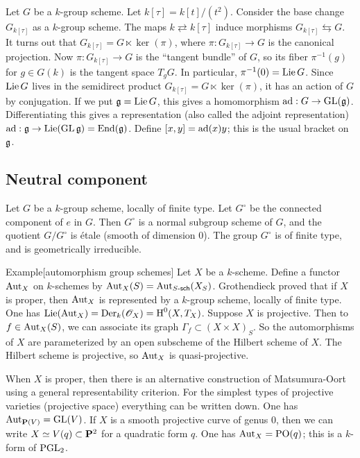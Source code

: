 Let $G$ be a $k$-group scheme. Let $k[\tau]=k[t]/(t^2)$. Consider the base 
change $G_{k[\tau]}$ as a $k$-group scheme. The maps $k\rightleftarrows k[\tau]$ 
induce morphisms $G_{k[\tau]} \leftrightarrows G$. It turns out that 
$G_{k[\tau]} = G\ltimes \ker(\pi)$, where $\pi:G_{k[\tau]} \to G$ is the canonical 
projection. Now $\pi:G_{k[\tau]}\to G$ is the ``tangent bundle'' of 
$G$, so its fiber $\pi^{-1}(g)$ for $g\in G(k)$ is the tangent space 
$T_g G$. In particular, $\pi^{-1}(0) = \operatorname{Lie} G$. Since $\operatorname{Lie} G$ lives in the 
semidirect product $G_{k[\tau]} = G\ltimes \ker(\pi)$, it has an action of 
$G$ by conjugation. If we put $\mathfrak{g}=\operatorname{Lie} G$, this gives a homomorphism 
$\operatorname{ad}:G\to \operatorname{GL}(\mathfrak{g})$. Differentiating this gives a representation 
(also called the adjoint representation) 
$\operatorname{ad}:\mathfrak{g} \to \operatorname{Lie}(\operatorname{GL}\mathfrak{g}) = \operatorname{End}(\mathfrak{g})$. Define 
$[x,y] = \operatorname{ad}(x) y$; this is the usual bracket on $\mathfrak{g}$. 


\subsection{Neutral component}

Let $G$ be a $k$-group scheme, locally of finite type. Let $G^\circ$ be the 
connected component of $e$ in $G$. Then $G^\circ$ is a normal subgroup scheme 
of $G$, and the quotient $G/G^\circ$ is \'etale (smooth of dimension $0$). The 
group $G^\circ$ is of finite type, and is geometrically irreducible. 

\begin{enonce}[remark]{Example}[automorphism group schemes]
Let $X$ be a $k$-scheme. Define a functor $\operatorname{Aut}_X$ on $k$-schemes 
by $\operatorname{Aut}_X(S) = \operatorname{Aut}_{S\textnormal{-}\mathsf{sch}}(X_S)$. 
Grothendieck proved that if $X$ is proper, then $\operatorname{Aut}_X$ is represented by a 
$k$-group scheme, locally of finite type. One has 
$\operatorname{Lie}(\operatorname{Aut}_X) = \operatorname{Der}_k(\mathscr{O}_X) = \operatorname{H}^0(X,T_X)$. Suppose 
$X$ is projective. Then to $f\in \operatorname{Aut}_X(S)$, we can associate its 
graph $\Gamma_f\subset (X\times X)_S$. So the automorphisms of $X$ are 
parameterized by an open subscheme of the Hilbert scheme of $X$. The Hilbert 
scheme is projective, so $\operatorname{Aut}_X$ is quasi-projective. 
\end{enonce}

When $X$ is proper, then there is an alternative construction of 
Matsumura-Oort using a general representability criterion. 
For the simplest types of projective varieties (projective space) everything 
can be written down. One has $\operatorname{Aut}_{\mathbf{P}(V)} = \operatorname{GL}(V)$. 
If $X$ is a smooth projective curve of genus $0$, then we can write 
$X\simeq V(q)\subset \mathbf{P}^2$ for a quadratic form $q$. One has 
$\operatorname{Aut}_X=\operatorname{PO}(q)$; this is a $k$-form of 
$\operatorname{PGL}_2$. 


